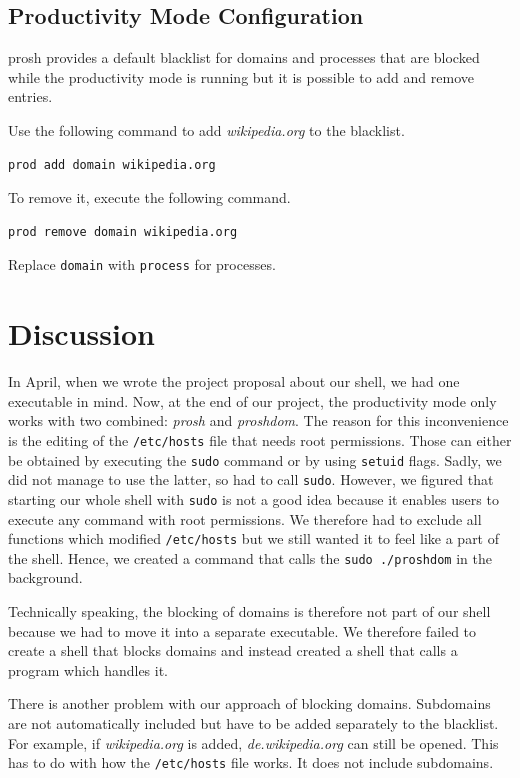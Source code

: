 \documentclass{article}
\begin{document}
\subsection{Productivity Mode Configuration}

prosh provides a default blacklist for domains and processes that are blocked while the productivity mode is running but it is possible to add and remove entries.

Use the following command to add \textit{wikipedia.org} to the blacklist.
\begin{lstlisting}[numbers=none]
prod add domain wikipedia.org
\end{lstlisting}

To remove it, execute the following command.
\begin{lstlisting}[numbers=none]
prod remove domain wikipedia.org
\end{lstlisting}

Replace \texttt{domain} with \texttt{process} for processes.

\section{Discussion}

In April, when we wrote the project proposal about our shell, we had one executable in mind. Now, at the end of our project, the productivity mode only works with two combined: \textit{prosh} and \textit{proshdom}. The reason for this inconvenience is the editing of the \texttt{/etc/hosts} file that needs root permissions. Those can either be obtained by executing the  \texttt{sudo} command or by using \texttt{setuid} flags. Sadly, we did not manage to use the latter, so had to call \texttt{sudo}. However, we figured that starting our whole shell with \texttt{sudo} is not a good idea because it enables users to execute any command with root permissions. We therefore had to exclude all functions which modified \texttt{/etc/hosts} but we still wanted it to feel like a part of the shell. Hence, we created a command that calls the \texttt{sudo ./proshdom} in the background.

Technically speaking, the blocking of domains is therefore not part of our shell because we had to move it into a separate executable. We therefore failed to create a shell that blocks domains and instead created a shell that calls a program which handles it.

There is another problem with our approach of blocking domains. Subdomains are not automatically included but have to be added separately to the blacklist. For example, if \textit{wikipedia.org} is added, \textit{de.wikipedia.org} can still be opened. This has to do with how the \texttt{/etc/hosts} file works. It does not include subdomains.
\end{document}
